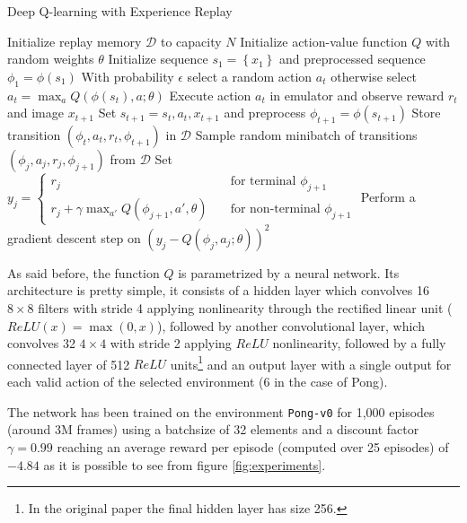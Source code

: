 \documentclass[a4paper]{article}
\numberwithin{equation}{section} %
\numberwithin{figure}{section} %
\numberwithin{table}{section} %
\theoremstyle{definition}
\begin{document}
\begin{algorithm}
	\caption{Deep Q-learning with Experience Replay\cite{mnih2013playing}}
	\label{algorithm:deep-q-learning-13}
	\begin{algorithmic}[1]
    \State Initialize replay memory $\mathcal{D}$ to capacity $N$
    \State Initialize action-value function $Q$ with random weights $\theta$
			\State Initialize sequence $s_1 = \left\{ x_1 \right\}$ and preprocessed sequence $\phi_1 = \phi(s_1)$
				\State With probability $\epsilon$ select a random action $a_t$
				\State otherwise select $a_t = \max_a Q(\phi(s_t), a; \theta)$
				\State Execute action $a_t$ in emulator and observe reward $r_t$ and image $x_{t+1}$
				\State Set $s_{t+1} = s_t, a_t, x_{t+1}$ and preprocess $\phi_{t+1} = \phi(s_{t+1})$
				\State Store transition $(\phi_t, a_t, r_t, \phi_{t+1})$ in $\mathcal{D}$
				\State Sample random minibatch of transitions $(\phi_j, a_j, r_j, \phi_{j+1})$ from $\mathcal{D}$
				\State Set $ y_j =
									   \begin{cases}
									     r_j       & \quad \text{for terminal } \phi_{j+1}\\
									     r_j + \gamma \max_{a'} Q(\phi_{j+1}, a', \theta)  & \quad \text{for non-terminal } \phi_{j+1}
									   \end{cases}
									 $
				\State Perform a gradient descent step on $(y_j - Q(\phi_j, a_j; \theta))^2$
			\EndFor
		\EndFor
	\end{algorithmic}
\end{algorithm}

As said before, the function $Q$ is parametrized by a neural network.
Its architecture is pretty simple, it consists of a hidden layer which convolves
16 $8 \times 8$ filters with stride 4 applying nonlinearity through the rectified
linear unit ($ReLU(x) = \max(0, x)$), followed by another convolutional layer,
which convolves 32 $4 \times 4$ with stride 2 applying $ReLU$ nonlinearity, followed
by a fully connected layer of 512 $ReLU$ units\footnote{In the original paper the final
hidden layer has size 256.} and an output layer with a single output for each
valid action of the selected environment (6 in the case of Pong).

The network has been trained on the environment \texttt{Pong-v0} for 1,000 episodes (around 3M frames) using a
batchsize of 32 elements and a discount factor $\gamma = 0.99$ reaching
an average reward per episode (computed over 25 episodes) of $-4.84$ as it is
possible to see from figure \ref{fig:experiments}.
\end{document}
